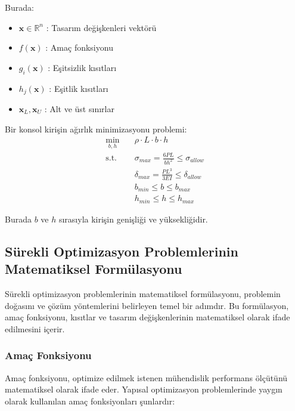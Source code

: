 Burada:
\begin{itemize}
    \item $\mathbf{x} \in \mathbb{R}^n$ : Tasarım değişkenleri vektörü
    \item $f(\mathbf{x})$ : Amaç fonksiyonu
    \item $g_i(\mathbf{x})$ : Eşitsizlik kısıtları
    \item $h_j(\mathbf{x})$ : Eşitlik kısıtları
    \item $\mathbf{x}_L, \mathbf{x}_U$ : Alt ve üst sınırlar
\end{itemize}

\begin{tcolorbox}[title=Sürekli Optimizasyon Örneği]
Bir konsol kirişin ağırlık minimizasyonu problemi:
\begin{align}
\min_{b,h} \quad & \rho \cdot L \cdot b \cdot h \\
\text{s.t.} \quad & \sigma_{max} = \frac{6PL}{bh^2} \leq \sigma_{allow} \\
& \delta_{max} = \frac{PL^3}{3EI} \leq \delta_{allow} \\
& b_{min} \leq b \leq b_{max} \\
& h_{min} \leq h \leq h_{max}
\end{align}

Burada $b$ ve $h$ sırasıyla kirişin genişliği ve yüksekliğidir.
\end{tcolorbox}



\subsection{Sürekli Optimizasyon Problemlerinin Matematiksel Formülasyonu}

Sürekli optimizasyon problemlerinin matematiksel formülasyonu, problemin doğasını ve çözüm yöntemlerini belirleyen temel bir adımdır. Bu formülasyon, amaç fonksiyonu, kısıtlar ve tasarım değişkenlerinin matematiksel olarak ifade edilmesini içerir.

\subsubsection{Amaç Fonksiyonu}
Amaç fonksiyonu, optimize edilmek istenen mühendislik performans ölçütünü matematiksel olarak ifade eder. Yapısal optimizasyon problemlerinde yaygın olarak kullanılan amaç fonksiyonları şunlardır:

